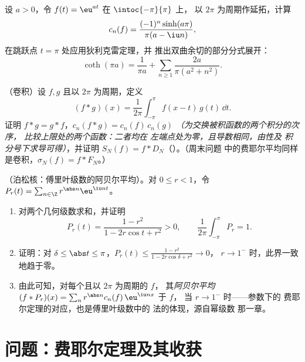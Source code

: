 \begin{exercise}[$\star\star$]\label{exo:b2:fourier:10}
设 $a > 0$，令 $f(t) = \eu^{at}$ 在 $\intoc{-\pi}{\pi}$ 上，
以 $2\pi$ 为周期作延拓，计算
\[
c_n(f) = \frac{(-1)^n\sinh(a\pi)}{\pi(a - \iu n)} ,
\]
在跳跃点 $t = \pi$ 处应用狄利克雷定理，并
推出双曲余切的部分分式展开：
\[
\coth(\pi a) = \frac{1}{\pi a} + \sum_{n\geq1}
\frac{2a}{\pi(a^2 + n^2)} .
\]
\end{exercise}

\begin{exercise}[$\star\star$]\label{exo:b2:fourier:11}
（卷积）设 $f, g$ 且以 $2\pi$ 为周期，定义
\[
(f * g)(x) = \frac{1}{2\pi}\int_{-\pi}^{\pi} f(x - t)\,g(t)\,
\dd t .
\]
证明 $f * g = g * f$，$c_n(f*g) = c_n(f)\,c_n(g)$
\emph{（为交换被积函数的两个积分的次序，
比较上限处的两个函数：二者均在
左端点处为零，且导数相同，由性及
积分号下求导可得）}，并证明 $S_N(f) =
f * D_N$（）。（周末问题
中的费耶尔平均同样是卷积，$\sigma_N(f) = f *
F_N$。）
\end{exercise}

\begin{exercise}[$\star\star\star$]\label{exo:b2:fourier:12}
（泊松核：傅里叶级数的阿贝尔平均）。对 $0 \leq r <
1$，令 $P_r(t) = \sum_{n\in\Z} r^{\abs n}\eu^{\iu nt}$。
\begin{enumerate}
  \item 对两个几何级数求和，并证明
        \[
        P_r(t) = \frac{1 - r^2}{1 - 2r\cos t + r^2} > 0,
        \qquad
        \frac{1}{2\pi}\int_{-\pi}^{\pi}P_r = 1 .
        \]
  \item 证明：对 $\delta \leq \abs t \leq \pi$，$P_r(t)
        \leq \frac{1 - r^2}{1 - 2r\cos\delta + r^2} \to 0$，
        $r \to 1^-$ 时，此界一致地趋于零。
  \item 由此可知，对每个且以 $2\pi$ 为周期的 $f$，
        其\emph{阿贝尔平均} $(f * P_r)(x) = \sum_n
        r^{\abs n}c_n(f)\,\eu^{\iu nx}$ 于 $f$，
        当 $r \to 1^-$ 时——参数下的
        费耶尔定理的对应，也是傅里叶级数中的
        法的体现，源自幂级数
        那一章。
\end{enumerate}
\end{exercise}

\section{问题：费耶尔定理及其收获}

